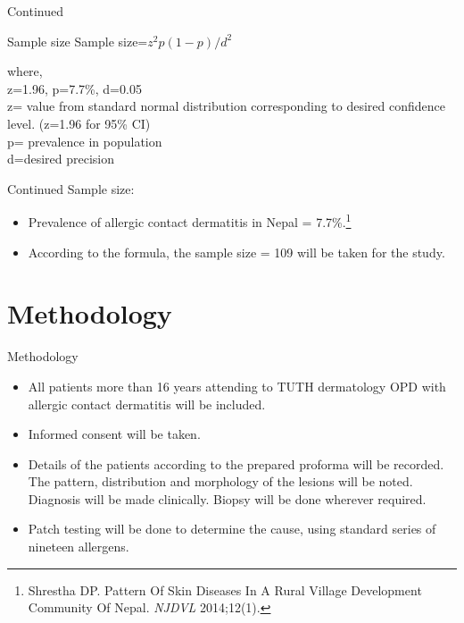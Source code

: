 \documentclass[11pt]{beamer}
\begin{document}
\begin{frame}{Continued}
\begin{block}{Sample size}
Sample size=\textbf{$z^2p(1-p)/d^2$}
\end{block}
where, \\
z=1.96, p=7.7\%, d=0.05 \\ \vspace{10pt}
z= value from standard normal distribution corresponding to desired confidence level. (z=1.96 for 95\% CI)\\ \vspace{3pt}
p= prevalence in population\\ \vspace{3pt}
d=desired precision\\

\end{frame}


\begin{frame}{Continued}
Sample size:
\begin{itemize}
\item Prevalence of allergic contact dermatitis in Nepal = 7.7\%.\footnote{Shrestha DP. Pattern Of Skin Diseases In A Rural Village Development Community Of Nepal. \textit{NJDVL} 2014;12(1).}
\item According to the formula, the sample size = 109 will be taken for the study.

\end{itemize}
\end{frame}

\section{Methodology}

\begin{frame}{Methodology}
\begin{itemize}
\item All patients more than 16 years attending to TUTH dermatology OPD with allergic contact dermatitis will be included.
\item Informed consent will be taken.
\item Details of the patients according to the prepared proforma will be recorded. The pattern, distribution and morphology of the lesions will be noted. Diagnosis will be made clinically. Biopsy will be done wherever required.
\item Patch testing will be done to determine the cause, using standard series of nineteen allergens.

\end{itemize}
\end{frame}
\end{document}
